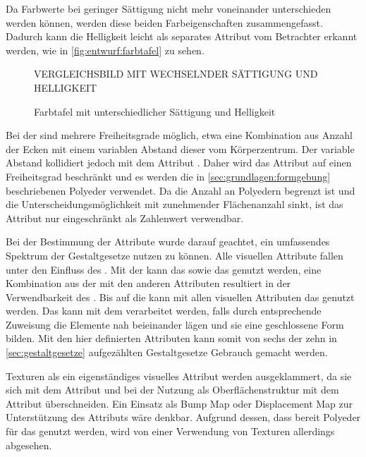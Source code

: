 Da Farbwerte bei geringer Sättigung nicht mehr voneinander unterschieden werden können, werden diese beiden Farbeigenschaften zusammengefasst. Dadurch kann die Helligkeit leicht als separates Attribut vom Betrachter erkannt werden, wie in \autoref{fig:entwurf:farbtafel} zu sehen.

\begin{figure}
	VERGLEICHSBILD MIT WECHSELNDER SÄTTIGUNG UND HELLIGKEIT
	\caption{Farbtafel mit unterschiedlicher Sättigung und Helligkeit}\label{fig:entwurf:farbtafel}
\end{figure}

Bei der  sind mehrere Freiheitsgrade möglich, etwa eine Kombination aus Anzahl der Ecken mit einem variablen Abstand dieser vom Körperzentrum. Der variable Abstand kollidiert jedoch mit dem Attribut . Daher wird das Attribut  auf einen Freiheitsgrad beschränkt und es werden die in \autoref{sec:grundlagen:formgebung} beschriebenen Polyeder verwendet. Da die Anzahl an Polyedern begrenzt ist und die Unterscheidungsmöglichkeit mit zunehmender Flächenanzahl sinkt, ist das Attribut  nur eingeschränkt als Zahlenwert verwendbar.

Bei der Bestimmung der Attribute wurde darauf geachtet, ein umfassendes Spektrum der Gestaltgesetze nutzen zu können. Alle visuellen Attribute fallen unter den Einfluss des . Mit der  kann das  sowie das  genutzt werden, eine Kombination aus der  mit den anderen Attributen resultiert in der Verwendbarkeit des . Bis auf die  kann mit allen visuellen Attributen das  genutzt werden. Das  kann mit dem  verarbeitet werden, falls durch entsprechende Zuweisung die Elemente nah beieinander lägen und sie eine geschlossene Form bilden. Mit den hier definierten Attributen kann somit von sechs der zehn in \autoref{sec:gestaltgesetze} aufgezählten Gestaltgesetze Gebrauch gemacht werden.

Texturen als ein eigenständiges visuelles Attribut werden ausgeklammert, da sie sich mit dem Attribut  und bei der Nutzung als Oberflächenstruktur mit dem Attribut  überschneiden. Ein Einsatz als Bump Map oder Displacement Map zur Unterstützung des Attributs  wäre denkbar. Aufgrund dessen, dass bereit Polyeder für das  genutzt werden, wird von einer Verwendung von Texturen allerdings abgesehen.

